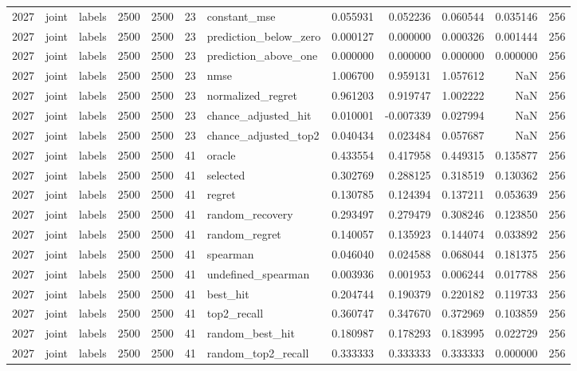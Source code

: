\begin{tabular}{rllrrrlrrrrr}
2027 & joint & labels & 2500 & 2500 & 23 & constant_mse & 0.055931 & 0.052236 & 0.060544 & 0.035146 & 256 \\
2027 & joint & labels & 2500 & 2500 & 23 & prediction_below_zero & 0.000127 & 0.000000 & 0.000326 & 0.001444 & 256 \\
2027 & joint & labels & 2500 & 2500 & 23 & prediction_above_one & 0.000000 & 0.000000 & 0.000000 & 0.000000 & 256 \\
2027 & joint & labels & 2500 & 2500 & 23 & nmse & 1.006700 & 0.959131 & 1.057612 & NaN & 256 \\
2027 & joint & labels & 2500 & 2500 & 23 & normalized_regret & 0.961203 & 0.919747 & 1.002222 & NaN & 256 \\
2027 & joint & labels & 2500 & 2500 & 23 & chance_adjusted_hit & 0.010001 & -0.007339 & 0.027994 & NaN & 256 \\
2027 & joint & labels & 2500 & 2500 & 23 & chance_adjusted_top2 & 0.040434 & 0.023484 & 0.057687 & NaN & 256 \\
2027 & joint & labels & 2500 & 2500 & 41 & oracle & 0.433554 & 0.417958 & 0.449315 & 0.135877 & 256 \\
2027 & joint & labels & 2500 & 2500 & 41 & selected & 0.302769 & 0.288125 & 0.318519 & 0.130362 & 256 \\
2027 & joint & labels & 2500 & 2500 & 41 & regret & 0.130785 & 0.124394 & 0.137211 & 0.053639 & 256 \\
2027 & joint & labels & 2500 & 2500 & 41 & random_recovery & 0.293497 & 0.279479 & 0.308246 & 0.123850 & 256 \\
2027 & joint & labels & 2500 & 2500 & 41 & random_regret & 0.140057 & 0.135923 & 0.144074 & 0.033892 & 256 \\
2027 & joint & labels & 2500 & 2500 & 41 & spearman & 0.046040 & 0.024588 & 0.068044 & 0.181375 & 256 \\
2027 & joint & labels & 2500 & 2500 & 41 & undefined_spearman & 0.003936 & 0.001953 & 0.006244 & 0.017788 & 256 \\
2027 & joint & labels & 2500 & 2500 & 41 & best_hit & 0.204744 & 0.190379 & 0.220182 & 0.119733 & 256 \\
2027 & joint & labels & 2500 & 2500 & 41 & top2_recall & 0.360747 & 0.347670 & 0.372969 & 0.103859 & 256 \\
2027 & joint & labels & 2500 & 2500 & 41 & random_best_hit & 0.180987 & 0.178293 & 0.183995 & 0.022729 & 256 \\
2027 & joint & labels & 2500 & 2500 & 41 & random_top2_recall & 0.333333 & 0.333333 & 0.333333 & 0.000000 & 256 \\

\end{tabular}
